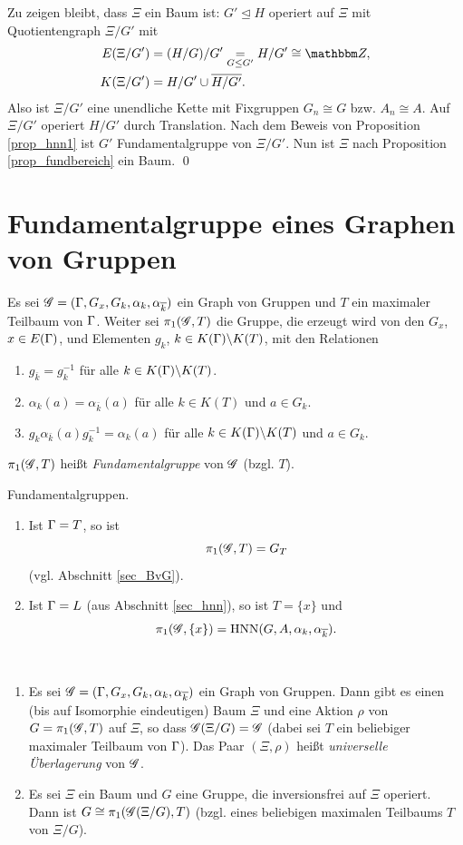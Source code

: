 \documentclass[a4paper, 12pt, twoside]{article}
\begin{document}
Zu zeigen bleibt, dass $\Xi$ ein Baum ist: $G' \unlhd H$ operiert auf
$\Xi$ mit Quotientengraph $\Xi/G'$ mit
\begin{align*}
E(\Xi/G') &= (H/G)/G' \us{=}{G\leq G'} H/G' \cong \ZZ, \\
K(\Xi/G') &= H/G' \cup \bar{H/G'}.
\end{align*}
Also ist $\Xi/G'$ eine unendliche Kette mit Fixgruppen
$G_n\cong G$ bzw. $A_n\cong A$.
Auf $\Xi/G'$ operiert $H/G'$ durch Translation.
Nach dem Beweis von Proposition \ref{prop_hnn1} ist $G'$
Fundamentalgruppe von $\Xi/G'$.
Nun ist $\Xi$ nach Proposition \ref{prop_fundbereich} ein Baum.
\qed


\section{Fundamentalgruppe eines Graphen von Gruppen}\label{sec_FG_GvG}

\DB\label{def_FG2}
Es sei $\mathscr{G}=(\Gamma,G_x,G_k,\alpha_k,\alpha_{\overline{k}})$ ein Graph
von Gruppen und $T$ ein maximaler Teilbaum von $\Gamma$.
Weiter sei $\pi_1(\mathscr{G},T)$ die Gruppe, die erzeugt wird
von den $G_x$, $x\in E(\Gamma)$, und Elementen $g_k$, $k\in K(\Gamma)\backslash K(T)$,
mit den Relationen
\begin{enumerate}
\item $g_{\bar{k}}=g_k^{-1}$ für alle $k\in K(\Gamma)\backslash K(T)$.
\item $\alpha_k(a)=\alpha_{\bar{k}}(a)$ für alle $k\in K(T)$ und
$a\in G_k$.
\item $g_k \alpha_{\bar{k}}(a) g_k^{-1} = \alpha_k(a)$
für alle $k\in K(\Gamma)\backslash K(T)$ und $a\in G_k$.
\end{enumerate}
$\pi_1(\mathscr{G},T)$ heißt \emph{Fundamentalgruppe}
von $\mathscr{G}$ (bzgl. $T$).

\BSP Fundamentalgruppen.
\begin{enumerate}
\item Ist $\Gamma=T$, so ist 
\[
\pi_1(\mathscr{G},T)=G_T
\]
(vgl. Abschnitt \ref{sec_BvG}).
\item Ist $\Gamma=L$ (aus Abschnitt \ref{sec_hnn}), so ist $T=\{x\}$ und
\[
\pi_1(\mathscr{G},\{x\})=\mathrm{HNN}(G,A,\alpha_k,\alpha_{\overline{k}}).
\]
\end{enumerate}

\SATZ \label{satz_cover}\
\begin{enumerate}
\item Es sei $\mathscr{G}=(\Gamma,G_x,G_k,\alpha_k,\alpha_{\overline{k}})$ ein
Graph von Gruppen.
Dann gibt es einen (bis auf Isomorphie eindeutigen) Baum $\Xi$
und eine Aktion $\rho$ von $G=\pi_1(\mathscr{G},T)$ auf $\Xi$, so dass
$\mathscr{G}(\Xi/G)=\mathscr{G}$ (dabei sei $T$ ein beliebiger maximaler Teilbaum
von $\Gamma$). Das Paar $(\Xi,\rho)$ heißt
\emph{universelle Überlagerung}
von $\mathscr{G}$.
\item Es sei $\Xi$ ein Baum und $G$ eine Gruppe, die inversionsfrei
auf $\Xi$ operiert. Dann ist $G\cong \pi_1(\mathscr{G}(\Xi/G),T)$
(bzgl. eines beliebigen maximalen Teilbaums $T$ von $\Xi/G$).
\end{enumerate}
\end{document}
